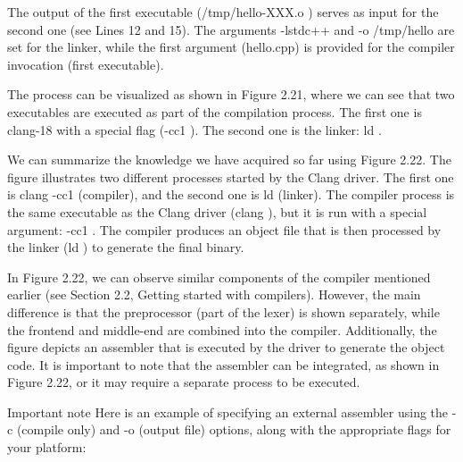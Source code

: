 The output of the first executable (/tmp/hello-XXX.o ) serves as input for the second one (see Lines 12 and 15). The arguments -lstdc++ and -o /tmp/hello are set for the linker, while the first argument (hello.cpp) is provided for the compiler invocation (first executable).


The process can be visualized as shown in Figure 2.21, where we can see that two executables are executed as part of the compilation process. The first one is clang-18 with a special flag (-cc1 ). The second one is the linker: ld .


We can summarize the knowledge we have acquired so far using Figure 2.22. The figure illustrates two different processes started by the Clang driver. The first one is clang -cc1 (compiler), and the second one is ld (linker). The compiler process is the same executable as the Clang driver (clang ), but it is run with a special argument: -cc1 . The compiler produces an object file that is then processed by the linker (ld ) to generate the final binary.


In Figure 2.22, we can observe similar components of the compiler mentioned earlier (see Section 2.2, Getting started with compilers). However, the main difference is that the preprocessor (part of the lexer) is shown separately, while the frontend and middle-end are combined into the compiler. Additionally, the figure depicts an assembler that is executed by the driver to generate the object code. It is important to note that the assembler can be integrated, as shown in Figure 2.22, or it may require a separate process to be executed.

\begin{myNotic}{Important note}
Here is an example of specifying an external assembler using the -c (compile only) and -o (output file) options, along with the appropriate flags for your platform:

\end{myNotic}

